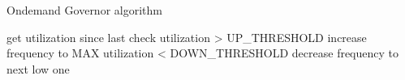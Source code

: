 
\begin{small}
\begin{algorithm}[t]
\caption{Ondemand Governor algorithm}
\label{algo:ondemand}
\begin{algorithmic}
\begin{footnotesize}
		\STATE get utilization since last check
		\STATE
		 utilization > UP\_THRESHOLD
		\STATE {} increase frequency to MAX
		\STATE
		 utilization < DOWN\_THRESHOLD
		\STATE {} decrease frequency to next low one
	\ENDFOR
\end{footnotesize}
\end{algorithmic}
\end{algorithm}
\end{small}


\begin{comment}
repeat every sampling rate
	for every core in the CPU
		get utilization since last check
		if (utilization > UP_THRESHOLD)
			increase frequency to MAX
		elif (utilization < DOWN_THRESHOLD)
			decrease frequency to next low one


\end{comment}

